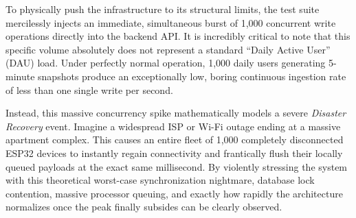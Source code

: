 To physically push the infrastructure to its structural limits, the test suite mercilessly injects an immediate, simultaneous burst of 1,000 concurrent write operations directly into the backend API. It is incredibly critical to note that this specific volume absolutely does not represent a standard ``Daily Active User'' (DAU) load. Under perfectly normal operation, 1,000 daily users generating 5-minute snapshots produce an exceptionally low, boring continuous ingestion rate of less than one single write per second. 

Instead, this massive concurrency spike mathematically models a severe \textit{Disaster Recovery} event. Imagine a widespread ISP or Wi-Fi outage ending at a massive apartment complex. This causes an entire fleet of 1,000 completely disconnected ESP32 devices to instantly regain connectivity and frantically flush their locally queued payloads at the exact same millisecond. By violently stressing the system with this theoretical worst-case synchronization nightmare, database lock contention, massive processor queuing, and exactly how rapidly the architecture normalizes once the peak finally subsides can be clearly observed.
